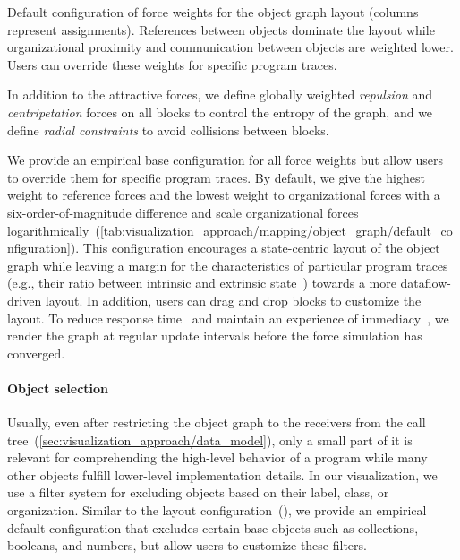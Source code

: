 \begin{table}
	\centering
	\caption{
		Default configuration of force weights for the object graph layout (columns represent assignments).
		References between objects dominate the layout while organizational proximity and communication between objects are weighted lower.
		Users can override these weights for specific program traces.
	}
	\label{tab:visualization_approach/mapping/object_graph/default_configuration}
	\begin{threeparttable}
		\centering
		{\footnotesize
		}
	\end{threeparttable}
\end{table}

In addition to the attractive forces, we define globally weighted \emph{repulsion} and \emph{centripetation} forces on all blocks to control the entropy of the graph, and we define \emph{radial constraints} to avoid collisions between blocks.

We provide an empirical base configuration for all force weights but allow users to override them for specific program traces.
By default, we give the highest weight to reference forces and the lowest weight to organizational forces with a six-order-of-magnitude difference and scale organizational forces logarithmically~(\cref{tab:visualization_approach/mapping/object_graph/default_configuration}).
This configuration encourages a state-centric layout of the object graph while leaving a margin for the characteristics of particular program traces (e.g., their ratio between intrinsic and extrinsic state~\cite[p. 218ff]{gamma1994design}) towards a more dataflow-driven layout.
In addition, users can drag and drop blocks to customize the layout.
To reduce response time~\cite[chap. 11]{shneiderman2005designing} and maintain an experience of immediacy~\cite{ungar1997debugging}, we render the graph at regular update intervals before the force simulation has converged.

\paragraph{Object selection}
\label{sec:visualization_approach/mapping/object_selection}

Usually, even after restricting the object graph to the receivers from the call tree~(\cref{sec:visualization_approach/data_model}), only a small part of it is relevant for comprehending the high-level behavior of a program while many other objects fulfill lower-level implementation details.
In our visualization, we use a filter system for excluding objects based on their label, class, or organization.
Similar to the layout configuration~(), we provide an empirical default configuration that excludes certain base objects such as collections, booleans, and numbers, but allow users to customize these filters.

